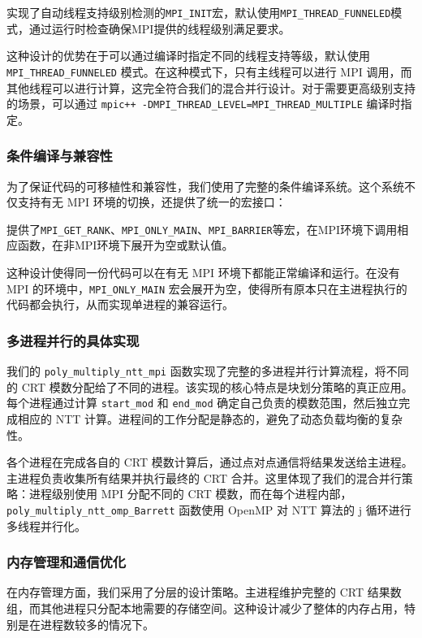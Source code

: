 \documentclass[a4paper]{article}
\begin{document}
实现了自动线程支持级别检测的\texttt{MPI\_INIT}宏，默认使用\texttt{MPI\_THREAD\_FUNNELED}模式，通过运行时检查确保MPI提供的线程级别满足要求。

这种设计的优势在于可以通过编译时指定不同的线程支持等级，默认使用 \texttt{MPI\_THREAD\_FUNNELED} 模式。在这种模式下，只有主线程可以进行 MPI 调用，而其他线程可以进行计算，这完全符合我们的混合并行设计。对于需要更高级别支持的场景，可以通过 \texttt{mpic++ -DMPI\_THREAD\_LEVEL=MPI\_THREAD\_MULTIPLE} 编译时指定。

\subsubsection{条件编译与兼容性}

为了保证代码的可移植性和兼容性，我们使用了完整的条件编译系统。这个系统不仅支持有无 MPI 环境的切换，还提供了统一的宏接口：

提供了\texttt{MPI\_GET\_RANK}、\texttt{MPI\_ONLY\_MAIN}、\texttt{MPI\_BARRIER}等宏，在MPI环境下调用相应函数，在非MPI环境下展开为空或默认值。

这种设计使得同一份代码可以在有无 MPI 环境下都能正常编译和运行。在没有 MPI 的环境中，\texttt{MPI\_ONLY\_MAIN} 宏会展开为空，使得所有原本只在主进程执行的代码都会执行，从而实现单进程的兼容运行。

\subsubsection{多进程并行的具体实现}

我们的 \texttt{poly\_multiply\_ntt\_mpi} 函数实现了完整的多进程并行计算流程，将不同的 CRT 模数分配给了不同的进程。该实现的核心特点是块划分策略的真正应用。每个进程通过计算 \texttt{start\_mod} 和 \texttt{end\_mod} 确定自己负责的模数范围，然后独立完成相应的 NTT 计算。进程间的工作分配是静态的，避免了动态负载均衡的复杂性。

各个进程在完成各自的 CRT 模数计算后，通过点对点通信将结果发送给主进程。主进程负责收集所有结果并执行最终的 CRT 合并。这里体现了我们的混合并行策略：进程级别使用 MPI 分配不同的 CRT 模数，而在每个进程内部，\texttt{poly\_multiply\_ntt\_omp\_Barrett} 函数使用 OpenMP 对 NTT 算法的 j 循环进行多线程并行化。

\subsubsection{内存管理和通信优化}

在内存管理方面，我们采用了分层的设计策略。主进程维护完整的 CRT 结果数组，而其他进程只分配本地需要的存储空间。这种设计减少了整体的内存占用，特别是在进程数较多的情况下。
\end{document}
